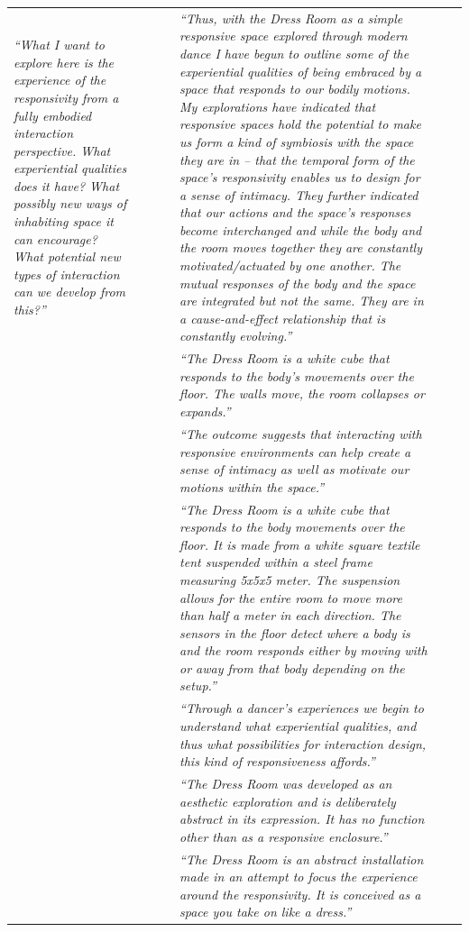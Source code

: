 \begin{landscape}
\begin{table}[p]
\begin{tabularx}{\linewidth}{@{}
    p{.16\linewidth}
    p{.12\linewidth}
    p{.10\linewidth}
    p{.13\linewidth}
    p{.20\linewidth}
    p{.12\linewidth}
    X
  @{}}
        \emph{``What I want to explore here is the experience of the responsivity from a fully embodied interaction perspective. What experiential qualities does it have? What possibly new ways of inhabiting space it can encourage? What potential new types of interaction can we develop from this?''} & & & & \emph{``Thus, with the Dress Room as a simple responsive space explored through modern dance I have begun to outline some of the experiential qualities of being embraced by a space that responds to our bodily motions. My explorations have indicated that responsive spaces hold the potential to make us form a kind of symbiosis with the space they are in – that the temporal form of the space’s responsivity enables us to design for a sense of intimacy. They further indicated that our actions and the space’s responses become interchanged and while the body and the room moves together they are constantly motivated/actuated by one another. The mutual responses of the body and the space are integrated but not the same. They are in a cause-and-effect relationship that is constantly evolving.''} & & \\
        & & & & \emph{``The Dress Room is a white cube that responds to the body’s movements over the floor. The walls move, the room collapses or expands.''} & &\\
        & & & & \emph{``The outcome suggests that interacting with responsive environments can help create a sense of intimacy as well as motivate our motions within the space.''} & & \\
        & & & & \emph{``The Dress Room is a white cube that responds to the body movements over the floor. It is made from a white square textile tent suspended within a steel frame measuring 5x5x5 meter. The suspension allows for the entire room to move more than half a meter in each direction. The sensors in the floor detect where a body is and the room responds either by moving with or away from that body depending on the setup.''} & & \\
        & & & & \emph{``Through a dancer’s experiences we begin to understand what experiential qualities, and thus what possibilities for interaction design, this kind of responsiveness affords.''} & &\\
        & & & & \emph{``The Dress Room was developed as an aesthetic exploration and is deliberately abstract in its expression. It has no function other than as a responsive enclosure.''} & &\\
        & & & & \emph{``The Dress Room is an abstract installation made in an attempt to focus the experience around the responsivity. It is conceived as a space you take on like a dress.''} & & \\

\end{tabularx}
\end{table}
\end{landscape}
